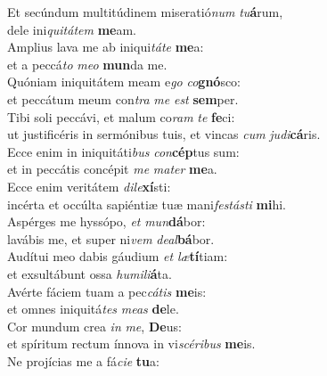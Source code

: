 \evenverse Et secúndum multitúdinem miseratió\textit{num} \textit{tu}\textbf{á}rum,~\*\\
\evenverse dele ini\textit{qui}\textit{tá}\textit{tem} \textbf{me}am.\\
\oddverse Amplius lava me ab iniqui\textit{tá}\textit{te} \textbf{me}a:~\*\\
\oddverse et a peccá\textit{to} \textit{me}\textit{o} \textbf{mun}da me.\\
\evenverse Quóniam iniquitátem meam e\textit{go} \textit{co}\textbf{gnó}sco:~\*\\
\evenverse et peccátum meum con\textit{tra} \textit{me} \textit{est} \textbf{sem}per.\\
\oddverse Tibi soli peccávi, et malum co\textit{ram} \textit{te} \textbf{fe}ci:~\*\\
\oddverse ut justificéris in sermónibus tuis, et vincas \textit{cum} \textit{ju}\textit{di}\textbf{cá}ris.\\
\evenverse Ecce enim in iniquitáti\textit{bus} \textit{con}\textbf{cép}tus sum:~\*\\
\evenverse et in peccátis concépit \textit{me} \textit{ma}\textit{ter} \textbf{me}a.\\
\oddverse Ecce enim veritátem \textit{di}\textit{le}\textbf{xí}sti:~\*\\
\oddverse incérta et occúlta sapiéntiæ tuæ mani\textit{fe}\textit{stá}\textit{sti} \textbf{mi}hi.\\
\evenverse Aspérges me hyssópo, \textit{et} \textit{mun}\textbf{dá}bor:~\*\\
\evenverse lavábis me, et super ni\textit{vem} \textit{de}\textit{al}\textbf{bá}bor.\\
\oddverse Audítui meo dabis gáudium \textit{et} \textit{læ}\textbf{tí}tiam:~\*\\
\oddverse et exsultábunt ossa \textit{hu}\textit{mi}\textit{li}\textbf{á}ta.\\
\evenverse Avérte fáciem tuam a pec\textit{cá}\textit{tis} \textbf{me}is:~\*\\
\evenverse et omnes iniquitá\textit{tes} \textit{me}\textit{as} \textbf{de}le.\\
\oddverse Cor mundum crea \textit{in} \textit{me}, \textbf{De}us:~\*\\
\oddverse et spíritum rectum ínnova in vi\textit{scé}\textit{ri}\textit{bus} \textbf{me}is.\\
\evenverse Ne projícias me a fá\textit{ci}\textit{e} \textbf{tu}a:~\*\\
